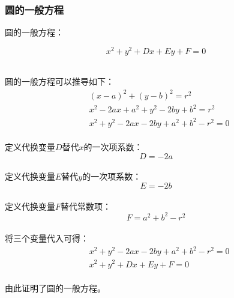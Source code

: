 \documentclass[UTF8]{ctexart}
\begin{document}
\subsubsection{圆的一般方程}
    圆的一般方程：
    \begin{large}
        \begin{equation*}
            x^2+y^2+Dx+Ey+F=0
        \end{equation*}
    \end{large}\\
    圆的一般方程可以推导如下：
    \setcounter{equation}{0}
    \begin{align}
        &(x-a)^2+(y-b)^2=r^2\\[4mm]
        &x^2-2ax+a^2+y^2-2by+b^2=r^2\\[4mm]
        &x^2+y^2-2ax-2by+a^2+b^2-r^2=0
    \end{align}\\
    定义代换变量$D$替代$x$的一次项系数：
    \begin{equation}
        D=-2a
    \end{equation}\\
    定义代换变量$E$替代$y$的一次项系数：
    \begin{equation}
        E=-2b
    \end{equation}\\
    定义代换变量$F$替代常数项：
    \begin{equation}
        F=a^2+b^2-r^2
    \end{equation}\\
    将三个变量代入可得：
    \begin{align}
        &x^2+y^2-2ax-2by+a^2+b^2-r^2=0\\[4mm]
        &x^2+y^2+Dx+Ey+F=0
    \end{align}\\
    由此证明了圆的一般方程。

\newpage
\end{document}

